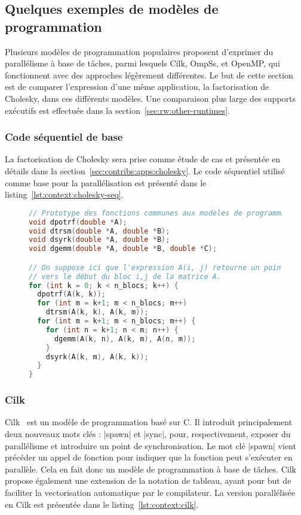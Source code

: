 \subsection{Quelques exemples de modèles de programmation}\label{sec:context:others:examples}

Plusieurs modèles de programmation populaires proposent d'exprimer du parallélisme à base de tâches, parmi lesquels Cilk, OmpSs, et OpenMP, qui fonctionnent avec des approches légèrement différentes.
Le but de cette section est de comparer l'expression d'une même application, la factorisation de Cholesky, dans ces différents modèles.
Une comparaison plus large des supports exécutifs est effectuée dans la section~\ref{sec:rw:other-runtimes}.


\subsubsection{Code séquentiel de base}

La factorisation de Cholesky sera prise comme étude de cas et présentée en détails dans la section~\ref{sec:contribs:apps:cholesky}.
Le code séquentiel utilisé comme base pour la parallélisation est présenté dans le listing~\ref{lst:context:cholesky-seq}.

\begin{figure}[h!]
\begin{lstlisting}[language=c++,caption=Algorithme séquentiel,label=lst:context:cholesky-seq]
// Prototype des fonctions communes aux modèles de programmation
void dpotrf(double *A);
void dtrsm(double *A, double *B);
void dsyrk(double *A, double *B);
void dgemm(double *A, double *B, double *C);

// On suppose ici que l'expression A(i, j) retourne un pointeur
// vers le début du bloc i,j de la matrice A.
for (int k = 0; k < n_blocs; k++) {
  dpotrf(A(k, k));
  for (int m = k+1; m < n_blocs; m++)
    dtrsm(A(k, k), A(k, m));
  for (int m = k+1; m < n_blocs; m++) {
    for (int n = k+1; n < m; n++) {
      dgemm(A(k, n), A(k, m), A(n, m));
    }
    dsyrk(A(k, m), A(k, k));
  }
}
\end{lstlisting}
\end{figure}

\subsubsection{Cilk}

Cilk~\cite{cilk5} est un modèle de programmation basé sur C.
Il introduit principalement deux nouveaux mots clés : |spawn| et |sync|, pour, respectivement, exposer du parallélisme et introduire un point de synchronisation.
Le mot clé |spawn| vient précéder un appel de fonction pour indiquer que la fonction peut s'exécuter en parallèle. Cela en fait donc un modèle de programmation à base de tâches.
Cilk propose également une extension de la notation de tableau, ayant pour but de faciliter la vectorisation automatique par le compilateur.
La version parallélisée en Cilk est présentée dans le listing~\ref{lst:context:cilk}.


